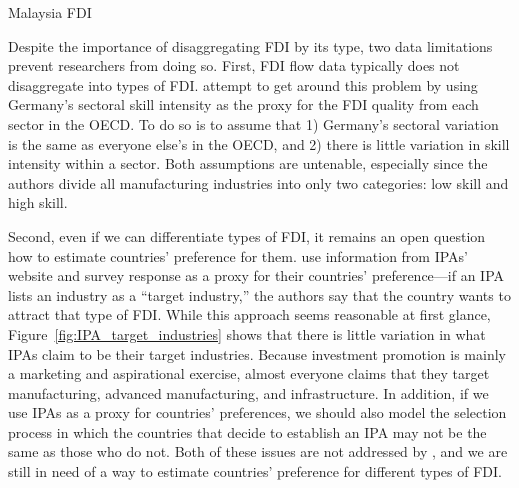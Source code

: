 Malaysia FDI \citep{Athukorala1995}

Despite the importance of disaggregating FDI by its type, two data limitations
prevent researchers from doing so. First, FDI flow data typically does not
disaggregate into types of FDI. \citet{Alfaro2007} attempt to get around this
problem by using Germany's sectoral skill intensity as the proxy for the FDI
quality from each sector in the OECD. To do so is to assume that 1) Germany's
sectoral variation is the same as everyone else's in the OECD, and 2) there is
little variation in skill intensity within a sector. Both assumptions are
untenable, especially since the authors divide all manufacturing industries into
only two categories: low skill and high skill.

Second, even if we can differentiate types of FDI, it remains an open question
how to estimate countries' preference for them. \citet{Alfaro2007} use
information from IPAs' website and survey response as a proxy for their
countries' preference---if an IPA lists an industry as a ``target industry,''
the authors say that the country wants to attract that type of FDI. While this
approach seems reasonable at first glance,
Figure~\ref{fig:IPA_target_industries} shows that there is little variation in
what IPAs claim to be their target industries. Because investment promotion is
mainly a marketing and aspirational exercise, almost everyone claims that they
target manufacturing, advanced manufacturing, and infrastructure. In addition,
if we use IPAs as a proxy for countries' preferences, we should also model the
selection process in which the countries that decide to establish an IPA may not
be the same as those who do not. Both of these issues are not addressed by
\citet{Alfaro2007}, and we are still in need of a way to estimate countries'
preference for different types of FDI.

